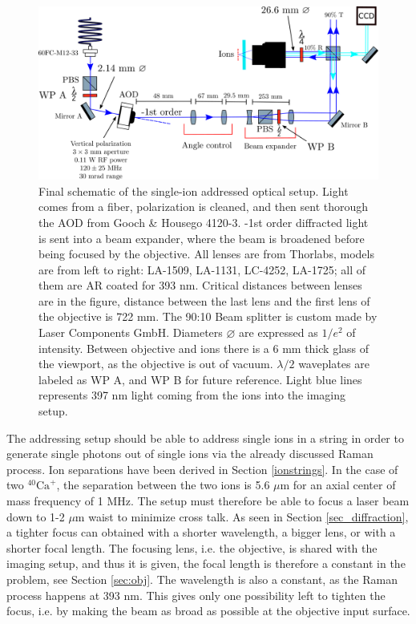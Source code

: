 \begin{figure}[H]
\centering
\includegraphics[width=\textwidth]{img/setup}
\caption{Final schematic of the single-ion addressed optical setup. Light comes from a fiber, polarization is cleaned, and then sent thorough the AOD from Gooch \& Housego 4120-3. -1st order diffracted light is sent into a beam expander, where the beam is broadened before being focused by the objective. All lenses are from Thorlabs, models are from left to right: LA-1509, LA-1131, LC-4252, LA-1725; all of them are AR coated for 393 nm. Critical distances between lenses are in the figure, distance between the last lens and the first lens of the objective is 722 mm. The 90:10 Beam splitter is custom made by Laser Components GmbH. Diameters $\varnothing$ are expressed as $1/e^2$ of intensity. Between objective and ions there is a 6 mm thick glass of the viewport, as the objective is out of vacuum. $\lambda/2$ waveplates are labeled as WP A, and WP B for future reference. Light blue lines represents 397 nm light coming from the ions into the imaging setup.}
\label{addressingsetup}
\end{figure}
The addressing setup should be able to address single ions in a string in order to generate single photons out of single ions via the already discussed Raman process. Ion separations have been derived in Section \ref{ionstrings}. In the case of two $^{40}\text{Ca}^+$, the separation between the two ions is 5.6 $\mu$m for an axial center of mass frequency of 1 MHz. The setup must therefore be able to focus a laser beam down to 1-2 $\mu$m waist to minimize cross talk. As seen in Section \ref{sec_diffraction}, a tighter focus can obtained with a shorter wavelength, a bigger lens, or with a shorter focal length. The focusing lens, i.e. the objective, is shared with the imaging setup, and thus it is given, the focal length is therefore a constant in the problem, see Section \ref{sec:obj}. The wavelength is also a constant, as the Raman process happens at 393 nm. This gives only one possibility left to tighten the focus, i.e. by making the beam as broad as possible at the objective input surface.\\
